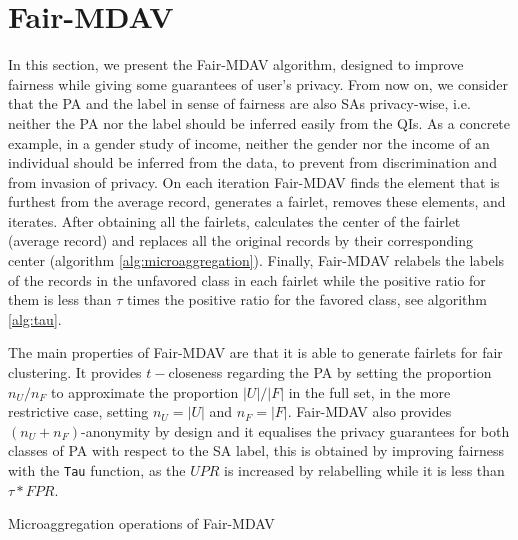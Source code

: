 \documentclass[runningheads]{llncs}
\begin{document}
\section{Fair-MDAV} 
\label{sec:our-approach}
In this section, we present the Fair-MDAV algorithm, designed to improve fairness while giving some guarantees of user's privacy. From now on, we consider that the PA and the label in sense of fairness are also SAs privacy-wise, i.e. neither the PA nor the label should be inferred easily from the QIs. As a concrete example, in a gender study of income, neither the gender nor the income of an individual should be inferred from the data, to prevent from discrimination and from invasion of privacy. On each iteration Fair-MDAV finds the element that is furthest from the average record, generates a fairlet, removes these elements, and iterates. After obtaining all the fairlets, calculates the center of the fairlet (average record) and replaces all the original records by their corresponding center (algorithm \ref{alg:microaggregation}). Finally, Fair-MDAV relabels the labels of the records in the unfavored class in each fairlet while the positive ratio for them is less than $\tau$ times the positive ratio for the favored class, see algorithm \ref{alg:tau}. 

The main properties of Fair-MDAV are that it is able to generate fairlets for fair clustering. It provides $t-$closeness regarding the PA by setting the proportion $n_U/n_F$ to approximate the proportion $|U|/|F|$ in the full set, in the more restrictive case, setting $n_U=|U|$ and $n_F = |F|$. Fair-MDAV also provides $(n_U + n_F)$-anonymity by design and it equalises the privacy guarantees for both classes of PA with respect to the SA label, this is obtained by improving fairness with the \texttt{Tau} function, as the $\textit{UPR}$ is increased by relabelling while it is less than $\tau * \textit{FPR}$.

\begin{algorithm}[p]
\caption{Microaggregation operations of Fair-MDAV}
\label{alg:microaggregation}
\end{algorithm}
\end{document}
